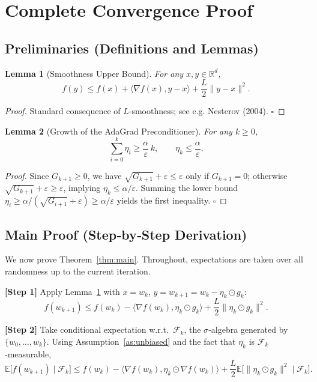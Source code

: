 \documentclass{article}
\newtheorem{lemma}{Lemma}
\newcommand{\E}{\mathbb{E}}
\newcommand{\R}{\mathbb{R}}
\begin{document}
\section*{Complete Convergence Proof}

\subsection*{Preliminaries (Definitions and Lemmas)}
\begin{lemma}[Smoothness Upper Bound]\label{lem:smooth}
For any $x,y\in\R^{d}$,
\[
f(y)\le f(x)+\langle\nabla f(x),y-x\rangle+\frac{L}{2}\|y-x\|^{2}.
\]
\end{lemma}
\begin{proof}
Standard consequence of $L$‑smoothness; see e.g. Nesterov (2004). \hfill $\square$
\end{proof}
\begin{lemma}[Growth of the AdaGrad Preconditioner]\label{lem:precond}
For any $k\ge0$,
\[
\sum_{i=0}^{k}\eta_{i}\ge\frac{\alpha}{\varepsilon}\,k,\qquad
\eta_{k}\le\frac{\alpha}{\varepsilon}.
\]
\end{lemma}
\begin{proof}
Since $G_{k+1}\ge0$, we have $\sqrt{G_{k+1}}+\varepsilon\le\varepsilon$ only if $G_{k+1}=0$;
otherwise $\sqrt{G_{k+1}}+\varepsilon\ge\varepsilon$, implying $\eta_{k}\le\alpha/\varepsilon$.
Summing the lower bound $\eta_{i}\ge\alpha/(\sqrt{G_{i+1}}+\varepsilon)\ge\alpha/\varepsilon$ yields the first inequality. \hfill $\square$
\end{proof}

\subsection*{Main Proof (Step‑by‑Step Derivation)}
We now prove Theorem~\ref{thm:main}.  Throughout, expectations are taken over all
randomness up to the current iteration.

\noindent\textbf{[Step 1]} Apply Lemma~\ref{lem:smooth} with $x=w_{k}$,
$y=w_{k+1}=w_{k}-\eta_{k}\odot g_{k}$:
\[
f(w_{k+1})\le f(w_{k})-\langle\nabla f(w_{k}),\eta_{k}\odot g_{k}\rangle
      +\frac{L}{2}\|\eta_{k}\odot g_{k}\|^{2}.                                   \tag{2}
\]

\noindent\textbf{[Step 2]} Take conditional expectation w.r.t.\ $\mathcal{F}_{k}$,
the $\sigma$‑algebra generated by $\{w_{0},\dots,w_{k}\}$.
Using Assumption~\ref{as:unbiased} and the fact that $\eta_{k}$ is $\mathcal{F}_{k}$‑measurable,
\[
\E\!\bigl[f(w_{k+1})\mid\mathcal{F}_{k}\bigr]
\le f(w_{k})
    -\langle\nabla f(w_{k}),\eta_{k}\odot\nabla f(w_{k})\rangle
    +\frac{L}{2}\E\!\bigl[\|\eta_{k}\odot g_{k}\|^{2}\mid\mathcal{F}_{k}\bigr]. \tag{3}
\]
\end{document}
